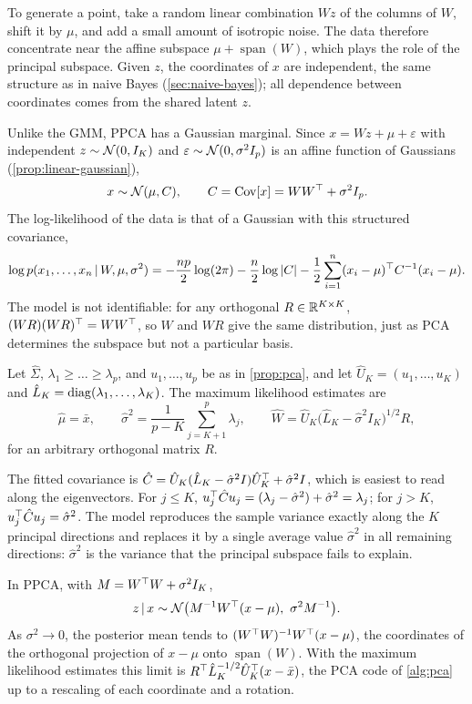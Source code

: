 To generate a point, take a random linear combination $Wz$ of the columns of $W$, shift it by $\mu$, and add a small amount of isotropic noise. The data therefore concentrate near the affine subspace $\mu+\operatorname{span}(W)$, which plays the role of the principal subspace. Given $z$, the coordinates of $x$ are independent, the same structure as in naive Bayes (\cref{sec:naive-bayes}); all dependence between coordinates comes from the shared latent $z$.

Unlike the GMM, PPCA has a Gaussian marginal. Since $x=Wz+\mu+\varepsilon$ with independent $z\sim\mathcal{N}(0,I_K)$ and $\varepsilon\sim\mathcal{N}(0,\sigma^2I_p)$ is an affine function of Gaussians (\cref{prop:linear-gaussian}),
\[
x\sim\mathcal{N}(\mu,C),\qquad C=\operatorname{Cov}[x]=WW^{\top}+\sigma^2I_p .
\]
The log-likelihood of the data is that of a Gaussian with this structured covariance,
\[
\log p(x_1,\dots,x_n\,|\, W,\mu,\sigma^2)=-\frac{np}2\log(2\pi)-\frac n2\log|C|-\frac12\sum_{i=1}^n(x_i-\mu)^{\top} C^{-1}(x_i-\mu).
\]
The model is not identifiable: for any orthogonal $R\in\mathbb{R}^{K\times K}$, $(WR)(WR)^{\top}=WW^{\top}$, so $W$ and $WR$ give the same distribution, just as PCA determines the subspace but not a particular basis.

\begin{theorem}\label{thm:ppca-mle}
Let $\hat\Sigma$, $\lambda_1\ge\dots\ge\lambda_p$, and $u_1,\dots,u_p$ be as in \cref{prop:pca}, and let $\hat U_K=(u_1,\dots,u_K)$ and $\hat L_K=\operatorname{diag}(\lambda_1,\dots,\lambda_K)$. The maximum likelihood estimates are
\[
\hat\mu=\bar x,\qquad
\hat\sigma^2=\frac1{p-K}\sum_{j=K+1}^p\lambda_j,\qquad
\hat W=\hat U_K\big(\hat L_K-\hat\sigma^2I_K\big)^{1/2}R,
\]
for an arbitrary orthogonal matrix $R$.
\end{theorem}

The fitted covariance is $\hat C=\hat U_K(\hat L_K-\hat\sigma^2I)\hat U_K^{\top}+\hat\sigma^2I$, which is easiest to read along the eigenvectors. For $j\le K$, $u_j^{\top}\hat Cu_j=(\lambda_j-\hat\sigma^2)+\hat\sigma^2=\lambda_j$; for $j>K$, $u_j^{\top}\hat Cu_j=\hat\sigma^2$. The model reproduces the sample variance exactly along the $K$ principal directions and replaces it by a single average value $\hat\sigma^2$ in all remaining directions: $\hat\sigma^2$ is the variance that the principal subspace fails to explain.

\begin{proposition}\label{prop:ppca-posterior}
In PPCA, with $M=W^{\top} W+\sigma^2I_K$,
\[
z\given x\sim\cN\big(M^{-1}W\T(x-\mu),\ \sigma^2M^{-1}\big).
\]
As $\sigma^2\to0$, the posterior mean tends to $(W^{\top} W)^{-1}W^{\top}(x-\mu)$, the coordinates of the orthogonal projection of $x-\mu$ onto $\operatorname{span}(W)$. With the maximum likelihood estimates this limit is $R^{\top}\hat L_K^{-1/2}\hat U_K^{\top}(x-\bar x)$, the PCA code of \cref{alg:pca} up to a rescaling of each coordinate and a rotation.
\end{proposition}

